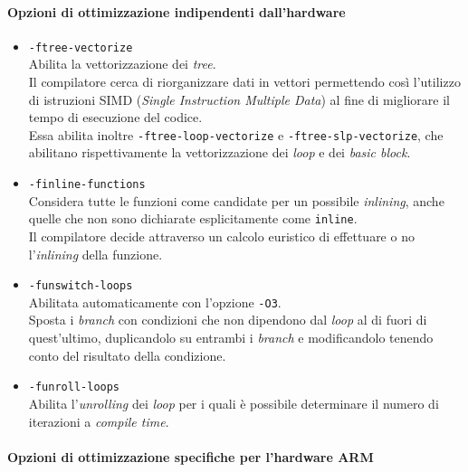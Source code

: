 \paragraph{Opzioni di ottimizzazione indipendenti dall'hardware}

\begin{itemize}
  
  \item \verb|-ftree-vectorize|\\
  Abilita la vettorizzazione dei \emph{tree}.\\
  Il compilatore cerca di riorganizzare dati in vettori permettendo così 
  l'utilizzo di istruzioni SIMD (\emph{Single Instruction Multiple Data}) al 
  fine di migliorare il tempo di esecuzione del codice.\\
  Essa abilita inoltre \verb|-ftree-loop-vectorize| e 
  \verb|-ftree-slp-vectorize|, che abilitano rispettivamente la vettorizzazione 
  dei \emph{loop} e dei \emph{basic block}.
  
  \item \verb|-finline-functions|\\
  Considera tutte le funzioni come candidate per un possibile \emph{inlining}, 
  anche quelle che non sono dichiarate esplicitamente come \verb|inline|.\\
  Il compilatore decide attraverso un calcolo euristico di effettuare o no 
  l'\emph{inlining} della funzione.
  
  \item \verb|-funswitch-loops|\\
  Abilitata automaticamente con l'opzione \verb|-O3|.\\
  Sposta i \emph{branch} con condizioni che non dipendono dal \emph{loop} al di 
  fuori di quest'ultimo, duplicandolo su entrambi i \emph{branch} e 
  modificandolo tenendo conto del risultato della condizione.
  
  \item \verb|-funroll-loops|\\
  Abilita l'\emph{unrolling} dei \emph{loop} per i quali è possibile 
  determinare il numero di iterazioni a \emph{compile time}.
  
\end{itemize}

\paragraph{Opzioni di ottimizzazione specifiche per l'hardware ARM}

